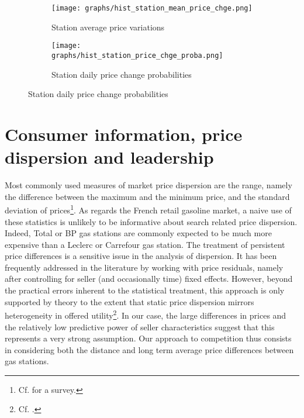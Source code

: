 \documentclass[english]{article}
\begin{document}
\begin{figure}[htb!]
\centering
\caption{Histograms of price change frequencies and values}
\begin{subfigure}{.49\textwidth}
\centering
\texttt{[image: graphs/hist\_station\_mean\_price\_chge.png]}
\caption[short]{Station average price variations}
\label{fig:hist_station_mean_price_chge}
\end{subfigure}
\begin{subfigure}{.49\textwidth}
\centering
\texttt{[image: graphs/hist\_station\_price\_chge\_proba.png]}
\caption[short]{Station daily price change probabilities}
\label{fig:hist_station_price_chge_proba}
\end{subfigure}
\end{figure}

\section{Consumer information, price dispersion and leadership}

Most commonly used measures of market price dispersion are the range, namely the difference between the maximum and the minimum price, and the standard deviation of prices\footnote{Cf. \cite{BAY06} for a survey.}. As regards the French retail gasoline market, a naive use of these statistics is unlikely to be informative about search related price dispersion. Indeed, Total or BP gas stations are commonly expected to be much more expensive than a Leclerc or Carrefour gas station. The treatment of persistent price differences is a sensitive issue in the analysis of dispersion. It has been frequently addressed in the literature by working with price residuals, namely after controlling for seller (and occasionally time) fixed effects. However, beyond the practical errors inherent to the statistical treatment, this approach is only supported by theory to the extent that static price dispersion mirrors heterogeneity in offered utility\footnote{Cf. \cite{WIL11}.}. In our case, the large differences in prices and the relatively low predictive power of seller characteristics suggest that this represents a very strong assumption. Our approach to competition thus consists in considering both the distance and long term average price differences between gas stations.
\end{document}
